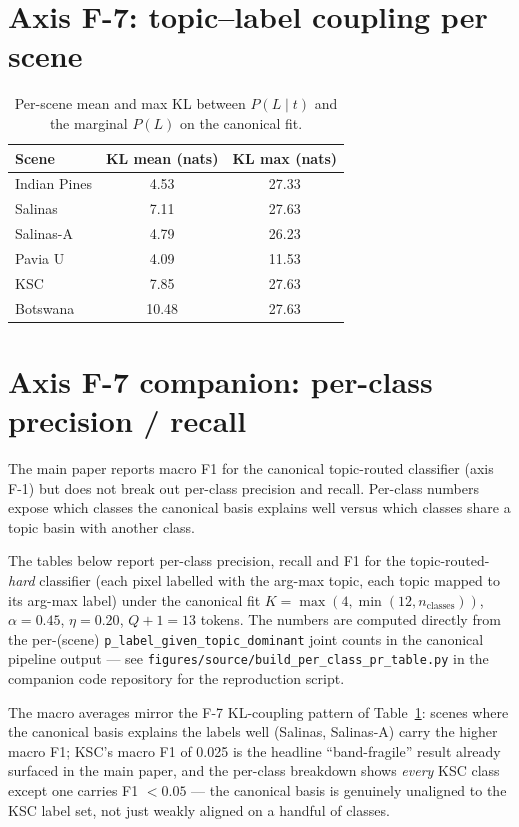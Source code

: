 \documentclass[11pt,a4paper]{article}
\begin{document}
\section{Axis F-7: topic--label coupling per scene}

\begin{table}[h]
\caption{Per-scene mean and max KL between $P(L \mid t)$ and the
marginal $P(L)$ on the canonical fit.}
\label{tab:b7}
\centering
\small
\begin{tabular}{l c c}
\toprule
Scene & KL mean (nats) & KL max (nats) \\
\midrule
Indian Pines & 4.53  & 27.33 \\
Salinas      & 7.11  & 27.63 \\
Salinas-A    & 4.79  & 26.23 \\
Pavia U      & 4.09  & 11.53 \\
KSC          & 7.85  & 27.63 \\
Botswana     & 10.48 & 27.63 \\
\bottomrule
\end{tabular}
\end{table}

\section{Axis F-7 companion: per-class precision / recall}
\label{sec:per_class_pr}

The main paper reports macro F1 for the canonical topic-routed
classifier (axis F-1) but does not break out per-class
precision and recall. Per-class numbers expose which classes the
canonical basis explains well versus which classes share a topic
basin with another class.

The tables below report per-class precision, recall and F1 for the
topic-routed-\emph{hard} classifier (each pixel labelled with the
arg-max topic, each topic mapped to its arg-max label) under the
canonical fit
$K = \max(4, \min(12, n_{\text{classes}}))$,
$\alpha = 0.45$, $\eta = 0.20$, $Q + 1 = 13$ tokens. The numbers are
computed directly from the per-(scene)
\texttt{p\_label\_given\_topic\_dominant} joint counts in the
canonical pipeline output --- see
\texttt{figures/source/build\_per\_class\_pr\_table.py} in the
companion code repository for the reproduction script.

The macro averages mirror the F-7 KL-coupling pattern of
Table~\ref{tab:b7}: scenes where the canonical basis explains the
labels well (Salinas, Salinas-A) carry the higher macro F1; KSC's
macro F1 of 0.025 is the headline ``band-fragile'' result already
surfaced in the main paper, and the per-class breakdown shows
\emph{every} KSC class except one carries F1 $< 0.05$ --- the
canonical basis is genuinely unaligned to the KSC label set, not
just weakly aligned on a handful of classes.
\end{document}
